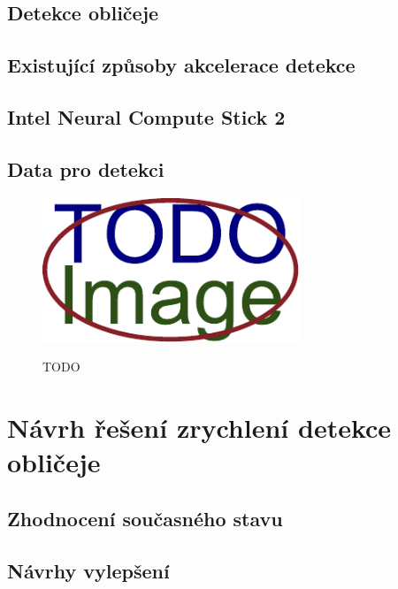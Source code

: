 \section{Detekce obličeje}
\todo{\blindtext}

\section{Existující způsoby akcelerace detekce}
\todo{\blindtext}


\section*{Intel Neural Compute Stick 2}
\todo{\blindtext}

\section{Data pro detekci}
\todo{\blindtext}

\begin{figure}[h]\centering
  \centering
  \includegraphics[width=\linewidth,height=1.7in]{obrazky-figures/placeholder.pdf}\\[1pt]
  \label{TODO}
  \caption{TODO}
\end{figure}



\chapter{Návrh řešení zrychlení detekce obličeje}
\label{kapitola:navrh_reseni}
\todo{\blindtext}

\section{Zhodnocení současného stavu}
\todo{\blindtext}

\section{Návrhy vylepšení}
\todo{\blindtext}


